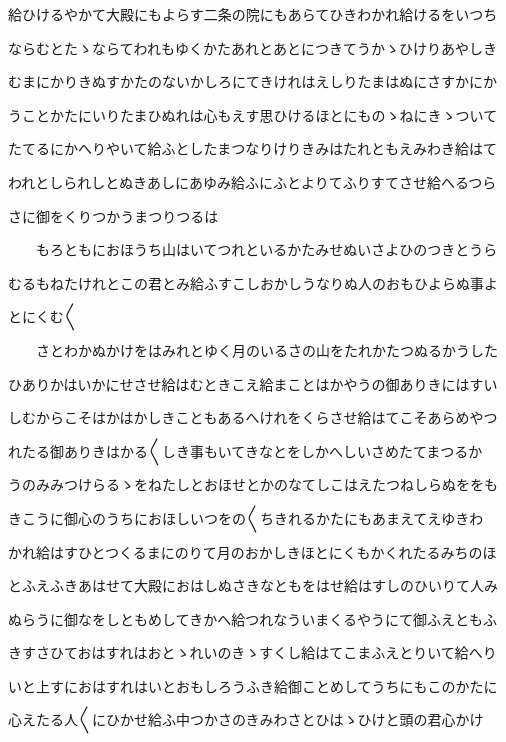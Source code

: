 \documentclass[a4paper,11pt,landscape]{ltjtarticle}
\begin{document}
\par\medskip
給ひけるやかて大殿にもよらす二条の院にもあらてひきわかれ給けるをいつち
\par\medskip
ならむとたゝならてわれもゆくかたあれとあとにつきてうかゝひけりあやしき
\par\medskip
むまにかりきぬすかたのないかしろにてきけれはえしりたまはぬにさすかにか
\par\medskip
うことかたにいりたまひぬれは心もえす思ひけるほとにものゝねにきゝついて
\par\medskip
たてるにかへりやいて給ふとしたまつなりけりきみはたれともえみわき給はて
\par\medskip
われとしられしとぬきあしにあゆみ給ふにふとよりてふりすてさせ給へるつら
\par\medskip
さに御をくりつかうまつりつるは
\par\medskip
　　もろともにおほうち山はいてつれといるかたみせぬいさよひのつきとうら
\par\medskip
むるもねたけれとこの君とみ給ふすこしおかしうなりぬ人のおもひよらぬ事よ
\par\medskip
とにくむ〱
\par\medskip
　　さとわかぬかけをはみれとゆく月のいるさの山をたれかたつぬるかうした
\par\medskip
ひありかはいかにせさせ給はむときこえ給まことはかやうの御ありきにはすい
\par\medskip
しむからこそはかはかしきこともあるへけれをくらさせ給はてこそあらめやつ
\par\medskip
れたる御ありきはかる〱しき事もいてきなとをしかへしいさめたてまつるか
\par\medskip
うのみみつけらるゝをねたしとおほせとかのなてしこはえたつねしらぬををも
\par\medskip
きこうに御心のうちにおほしいつをの〱ちきれるかたにもあまえてえゆきわ
\par\medskip
かれ給はすひとつくるまにのりて月のおかしきほとにくもかくれたるみちのほ
\par\medskip
とふえふきあはせて大殿におはしぬさきなともをはせ給はすしのひいりて人み
\par\medskip
ぬらうに御なをしともめしてきかへ給つれなういまくるやうにて御ふえともふ
\par\medskip
きすさひておはすれはおとゝれいのきゝすくし給はてこまふえとりいて給へり
\par\medskip
いと上すにおはすれはいとおもしろうふき給御ことめしてうちにもこのかたに
\par\medskip
心えたる人〱にひかせ給ふ中つかさのきみわさとひはゝひけと頭の君心かけ
\end{document}
